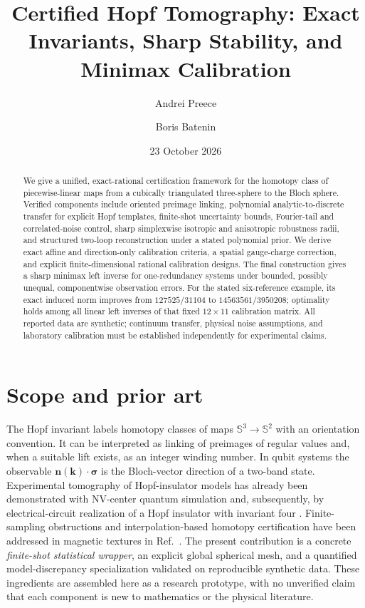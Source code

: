 \documentclass[aps,prd,onecolumn,notitlepage,11pt,superscriptaddress,longbibliography]{revtex4-2}
\newcommand{\Sph}{\mathbb S}
\begin{document}
\title{Certified Hopf Tomography: Exact Invariants, Sharp Stability, and Minimax Calibration}
\author{Andrei Preece}
\author{Boris Batenin}
\date{23 October 2026}
\begin{abstract}
We give a unified, exact-rational certification framework for the homotopy
class of piecewise-linear maps from a cubically triangulated three-sphere
to the Bloch sphere. Verified components include oriented preimage linking,
polynomial analytic-to-discrete transfer for explicit Hopf templates,
finite-shot uncertainty bounds, Fourier-tail and correlated-noise control,
sharp simplexwise isotropic and anisotropic robustness radii, and
structured two-loop reconstruction under a stated polynomial prior.
We derive exact affine and direction-only calibration criteria, a spatial
gauge-charge correction, and explicit finite-dimensional rational
calibration designs. The final construction gives a sharp minimax left
inverse for one-redundancy systems under bounded, possibly unequal,
componentwise observation errors. For the stated six-reference example,
its exact induced norm improves from $127525/31104$ to
$14563561/3950208$; optimality holds among all linear left inverses of
that fixed $12\times11$ calibration matrix. All reported data are synthetic;
continuum transfer, physical noise assumptions, and laboratory calibration
must be established independently for experimental claims.
\end{abstract}
\maketitle

\section{Scope and prior art}
The Hopf invariant labels homotopy classes of maps $\Sph^3\to\Sph^2$ with an orientation convention. It can be interpreted as linking of preimages of regular values and, when a suitable lift exists, as an integer winding number. In qubit systems the observable $\bm n(\bm k)\cdot\bm\sigma$ is the Bloch-vector direction of a two-band state. Experimental tomography of Hopf-insulator models has already been demonstrated with NV-center quantum simulation \cite{Yuan2017} and, subsequently, by electrical-circuit realization of a Hopf insulator with invariant four \cite{Wang2023}. Finite-sampling obstructions and interpolation-based homotopy certification have been addressed in magnetic textures in Ref.~\cite{Klemm2026}. The present contribution is a concrete \emph{finite-shot statistical wrapper}, an explicit global spherical mesh, and a quantified model-discrepancy specialization validated on reproducible synthetic data. These ingredients are assembled here as a research prototype, with no unverified claim that each component is new to mathematics or the physical literature.
\end{document}
